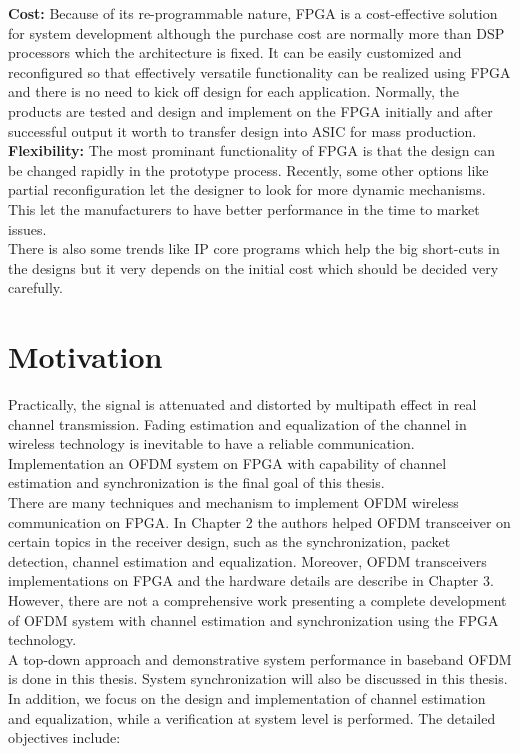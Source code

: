 \textbf{Cost:} Because of its re-programmable nature, FPGA is a cost-effective solution for system development although the purchase cost are normally more than DSP processors which the architecture is fixed. It can be easily customized and reconfigured so that effectively versatile functionality can be realized using FPGA and there is no need to kick off design for each application. Normally, the products are tested and design and implement on the FPGA initially and after successful output it worth to transfer design into ASIC for mass production.\\

\textbf{Flexibility:} The most prominant functionality of FPGA is that the design can be changed rapidly in the prototype process. Recently, some other options like partial reconfiguration let the designer to look for more dynamic mechanisms. This let the manufacturers to have better performance in the time to market issues.\\
There is also some trends like IP core programs which help the big short-cuts in the designs but it very depends on the initial cost which should be decided very carefully.


\section{Motivation}

Practically, the signal is attenuated and distorted by multipath effect in real channel transmission. Fading estimation and equalization of the channel in wireless technology is inevitable to have a reliable communication. Implementation an OFDM system on FPGA with capability of channel estimation and synchronization is the final goal of this thesis.\\
There are many techniques and mechanism to implement OFDM wireless communication on FPGA. In Chapter 2 the authors helped OFDM transceiver on certain topics in the receiver design, such as the synchronization, packet detection, channel estimation and equalization. Moreover, OFDM transceivers implementations on FPGA and the hardware details are describe in Chapter 3. However, there are not a comprehensive work presenting a complete development of OFDM system with channel estimation and synchronization using the FPGA technology.\\

A top-down approach and demonstrative system performance in baseband OFDM is done in this thesis. System synchronization will also be discussed in this thesis. In addition, we focus on the design and implementation of channel estimation and equalization, while a verification at system level is performed. The detailed objectives include:\\


